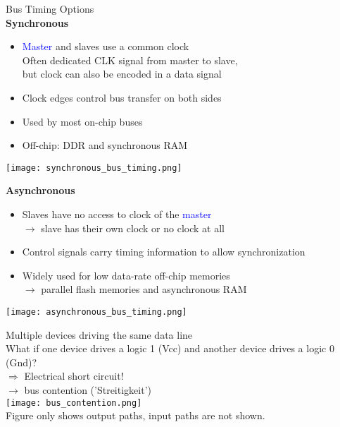 \begin{theorem}{Bus Timing Options}\\
    \textbf{Synchronous}
    \begin{itemize}
        \item \textcolor{blue}{Master} and \textcolor{darkcorn}{slaves} use a common clock\\
        Often dedicated CLK signal from master to slave, \\ but clock can also be encoded in a data signal
        \item Clock edges control bus transfer on both sides
        \item Used by most on-chip buses
        \item Off-chip: DDR and synchronous RAM
    \end{itemize}
    \begin{center}
    \texttt{[image: synchronous\_bus\_timing.png]}
    \end{center}
    \textbf{Asynchronous}
    \begin{itemize}
        \item \textcolor{darkcorn}{Slaves} have no access to clock of the \textcolor{blue}{master}
        \\ $\rightarrow$ slave has their own clock or no clock at all
        \item Control signals carry timing information to allow synchronization
        \item Widely used for low data-rate off-chip memories \\
        $\rightarrow$ parallel flash memories and asynchronous RAM
    \end{itemize}
    \begin{center}
        \texttt{[image: asynchronous\_bus\_timing.png]}
    \end{center}
\end{theorem}


\begin{corollary}{Multiple devices driving the same data line}\\
    What if one device drives a logic 1 (Vcc) and another device drives a logic 0 (Gnd)?\\
    $\Rightarrow$ Electrical short circuit!
    \\ $\rightarrow$ bus contention ('Streitigkeit')\\
    \texttt{[image: bus\_contention.png]}\\
    \small{Figure only shows output paths, input paths are not shown.}

\end{corollary}



